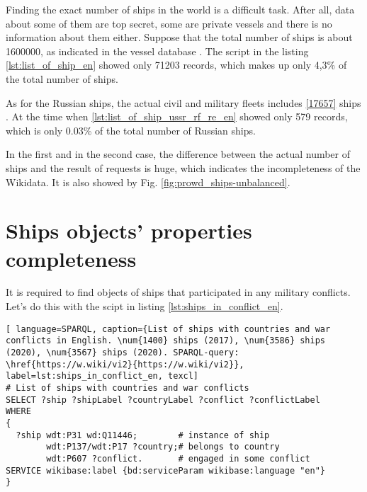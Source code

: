 Finding the exact number of ships in the world is a difficult task. After all, data about some of them are top secret, some are private vessels and there is no information about them either. Suppose that the total number of ships is about \num{1600000}, as indicated in the vessel database . The script in the listing \ref{lst:list_of_ship_en} showed only \num{71203} records, which makes up only 4,3\% of the total number of ships. 

As for the Russian ships, the actual civil and military fleets includes \ref{17657} ships . At the time when \ref{lst:list_of_ship_ussr_rf_re_en} showed only 579 records, which is only 0.03\% of the total number of Russian ships. 

In the first and in the second case, the difference between the actual number of ships and the result of requests is huge, which indicates the incompleteness of the Wikidata. It is also showed by Fig. \ref{fig:prowd_ships-unbalanced}.


\section{Ships objects' properties completeness}

It is required to find objects of ships that participated in any military conflicts. Let's do this with the scipt in listing \ref{lst:ships_in_conflict_en}.


\begin{lstlisting}[ language=SPARQL, caption={List of ships with countries and war conflicts in English. \num{1400} ships (2017), \num{3586} ships (2020), \num{3567} ships (2020). SPARQL-query: \href{https://w.wiki/vi2}{https://w.wiki/vi2}}, label=lst:ships_in_conflict_en, texcl]
# List of ships with countries and war conflicts
SELECT ?ship ?shipLabel ?countryLabel ?conflict ?conflictLabel
WHERE
{
  ?ship wdt:P31 wd:Q11446;        # instance of ship
        wdt:P137/wdt:P17 ?country;# belongs to country
        wdt:P607 ?conflict.       # engaged in some conflict
SERVICE wikibase:label {bd:serviceParam wikibase:language "en"}
}
\end{lstlisting}


